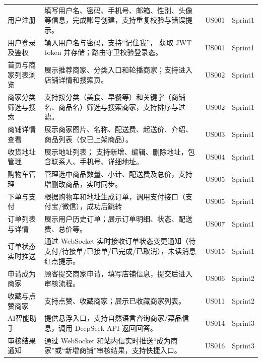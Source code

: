 \begin{longtable}{>{\centering\arraybackslash}m{3cm} >{\centering\arraybackslash}m{6.5cm} >{\centering\arraybackslash}m{2cm} >{\centering\arraybackslash}m{2cm}}
    用户注册         & 填写用户名、密码、手机号、邮箱、性别、头像等信息，完成账号创建，支持重复校验与错误提示。             & US001              & Sprint1       \\
    用户登录及鉴权      & 输入用户名与密码，支持“记住我”， 获取 JWT token 并存储；路由守卫校验登录态。            & US001              & Sprint1       \\
    首页与商家列表浏览    & 展示推荐商家、分类入口和轮播商家；支持进入店铺详情和搜索页。                           & US002              & Sprint1       \\
    商家分类筛选与搜索    & 支持按分类（美食、早餐等）和关键字（商铺名、商品名）筛选与搜索商家，支持排序与过滤。               & US002              & Sprint1       \\
    商铺详情查看       & 展示商家图片、名称、配送费、起送价、介绍、商品列表（仅已上架商品）。                       & US003              & Sprint1       \\
    收货地址管理       & 展示地址列表； 支持新增、编辑、删除地址，包含联系人、手机号、详细地址。                     & US004              & Sprint1       \\
    购物车管理        & 管理选中商品数量、小计、配送费及总价，支持增删改商品，实时同步。                         & US005              & Sprint1       \\
    下单与支付        & 根据购物车和地址生成订单，调用支付接口（支付宝/微信），成功后跳转                        & US005              & Sprint1       \\
    订单列表与详情      & 展示用户历史订单；展示订单明细、状态、配送费、总价等。                              & US007              & Sprint1       \\
    订单状态实时推送     & 通过 WebSocket 实时接收订单状态变更通知（待支付/待接单/已接单/已完成/已取消），未读消息红点提示。 & US015              & Sprint1       \\
    申请成为商家       & 顾客提交商家申请，填写店铺信息，提交后进入审核流程。                               & US006              & Sprint2       \\
    收藏与点赞商家      & 支持点赞、收藏商家；展示已收藏商家列表。                                     & US011              & Sprint2       \\
    AI智能助手       & 提供悬浮入口，支持自然语言咨询商家/菜品信息，调用 DeepSeek API 返回回答。             & US014              & Sprint3       \\
    审核结果通知       & 通过 WebSocket 和站内信实时推送“成为商家”或“新增商铺”审核结果，支持快捷入口。           & US016              & Sprint3       \\
\end{longtable}

